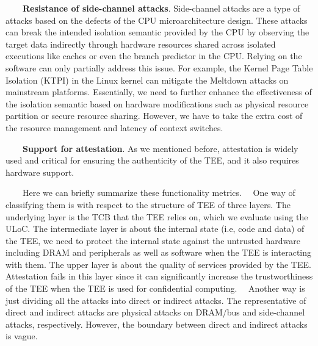 \documentclass[12pt,twoside]{report}
\begin{document}
\ \ \ \ \textbf{Resistance of side-channel attacks}. Side-channel attacks are a type of attacks based on the defects of the CPU microarchitecture design. These attacks can break the intended isolation semantic provided by the CPU by observing the target data indirectly through hardware resources shared across isolated executions like caches or even the branch predictor in the CPU. Relying on the software can only partially address this issue. For example, the Kernel Page Table Isolation (KTPI)\cite{kpti} in the Linux kernel can mitigate the Meltdown attacks\cite{lipp2018meltdown} on mainstream platforms. Essentially, we need to further enhance the effectiveness of the isolation semantic based on hardware modifications such as physical resource partition or secure resource sharing. However, we have to take the extra cost of the resource management and latency of context switches.

\ \ \ \ \textbf{Support for attestation}. As we mentioned before, attestation is widely used and critical for ensuring the authenticity of the TEE, and it also requires hardware support.

\ \ \ \ Here we can briefly summarize these functionality metrics. \ \ One way of classifying them is with respect to the structure of TEE of three layers. The underlying layer is the TCB that the TEE relies on, which we evaluate using the ULoC. The intermediate layer is about the internal state (i.e, code and data) of the TEE, we need to protect the internal state against the untrusted hardware including DRAM and peripherals as well as software when the TEE is interacting with them. The upper layer is about the quality of services provided by the TEE. Attestation fails in this layer since it can significantly increase the trustworthiness of the TEE when the TEE is used for confidential computing. \ \ Another way is just dividing all the attacks into direct or indirect attacks. The representative of direct and indirect attacks are physical attacks on DRAM/bus and side-channel attacks, respectively. However, the boundary between direct and indirect attacks is vague.

\end{document}
